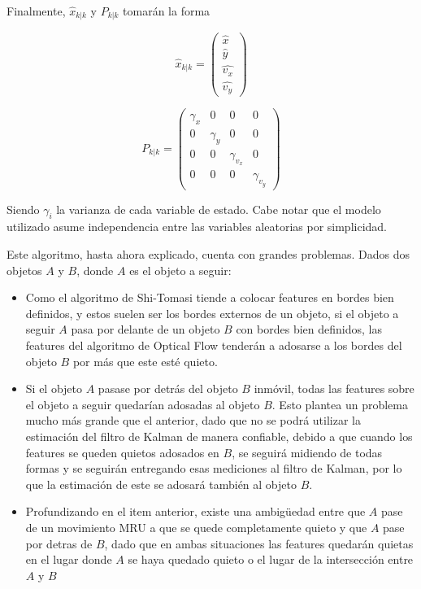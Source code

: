 Finalmente, $\hat{x}_{k|k}$ y $P_{k|k}$ tomarán la forma

\begin{equation}
\hat{x}_{k|k} = 
\begin{pmatrix}
\hat{x}\\
\hat{y}\\
\hat{v_x}\\
\hat{v_y}
\end{pmatrix}
\end{equation}

\begin{equation}
P_{k|k} = 
\begin{pmatrix}
\gamma_{x} & 0 & 0  & 0\\
0 & \gamma_{y}  & 0 & 0\\
0 & 0  & \gamma_{v_x}  & 0\\
0 & 0  & 0  & \gamma_{v_y} 
\end{pmatrix}
\end{equation}

Siendo $\gamma_{i}$ la varianza de cada variable de estado. Cabe notar que el modelo utilizado asume independencia entre las variables aleatorias por simplicidad.

Este algoritmo, hasta ahora explicado, cuenta con grandes problemas. Dados dos objetos $A$ y $B$, donde $A$ es el objeto a seguir:

\begin{itemize}
\item Como el algoritmo de Shi-Tomasi tiende a colocar features en bordes bien definidos, y estos suelen ser los bordes externos de un objeto, si el objeto a seguir $A$ pasa por delante de un objeto $B$ con bordes bien definidos, las features del algoritmo de Optical Flow tenderán a adosarse a los bordes del objeto $B$ por más que este esté quieto.
\item Si el objeto $A$ pasase por detrás del objeto $B$ inmóvil, todas las features sobre el objeto a seguir quedarían adosadas al objeto $B$. Esto plantea un problema mucho más grande que el anterior, dado que no se podrá utilizar la estimación del filtro de Kalman de manera confiable, debido a que cuando los features se queden quietos adosados en $B$, se seguirá midiendo de todas formas y se seguirán entregando esas mediciones al filtro de Kalman, por lo que la estimación de este se adosará también al objeto $B$.
\item Profundizando en el item anterior, existe una ambigüedad entre que $A$ pase de un movimiento MRU a que se quede completamente quieto y que $A$ pase por detras de $B$, dado que en ambas situaciones las features quedarán quietas en el lugar donde $A$ se haya quedado quieto o el lugar de la intersección entre $A$ y $B$
\end{itemize}

